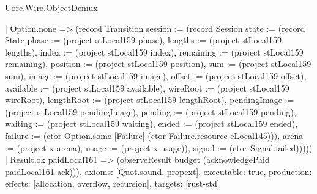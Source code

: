 \begin{lexlean}{Uorc.Wire.ObjectDemux}
\begin{semanticmodule}
{        | Option.none => (record Transition {session := (record Session {state := (record State {phase := (project stLocal159 phase), lengths := (project stLocal159 lengths), index := (project stLocal159 index), remaining := (project stLocal159 remaining), position := (project stLocal159 position), sum := (project stLocal159 sum), image := (project stLocal159 image), offset := (project stLocal159 offset), available := (project stLocal159 available), wireRoot := (project stLocal159 wireRoot), lengthRoot := (project stLocal159 lengthRoot), pendingImage := (project stLocal159 pendingImage), pending := (project stLocal159 pending), waiting := (project stLocal159 waiting), ended := (project stLocal159 ended), failure := (ctor Option.some [Failure] (ctor Failure.resource eLocal145))}), arena := (project x arena), usage := (project x usage)}), signal := (ctor Signal.failed)}))))
    | Result.ok paidLocal161 => (observeResult budget (acknowledgePaid paidLocal161 ack))),
  axioms: [Quot.sound, propext],
  executable: true,
  production: {effects: [allocation, overflow, recursion], targets: [rust-std]}
}


\end{semanticmodule}
\end{lexlean}
